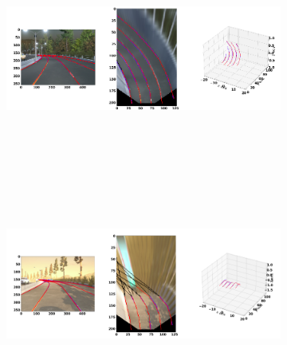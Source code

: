     \begin{figure}[h]
      \caption{Qualitative results of the GenLaneNet\cite{guo2020gen} trained with complex binary lane segmentation architecture on rarely observed scenes from sim3D\cite{guo2020gen} dataset: (a) uphill (b) downhill scenario. The ground-truth lines are color-coded in red and the predicted lanes in blue.}
        \centering
        \begin{subfigure}{1\textwidth}
        \includegraphics[width=1\linewidth, height=7cm]{images/uphill_rare.png} 
        \caption{\cite{guo2020gen}}
        \label{fig:subim1}
        \end{subfigure}
        \begin{subfigure}{1\textwidth}
        \includegraphics[width=1\linewidth,height=7cm]{images/downhill_rare.png}
        \caption{\cite{guo2020gen}}
        \label{fig:subim2}
        \end{subfigure}
        \end{figure}
        
